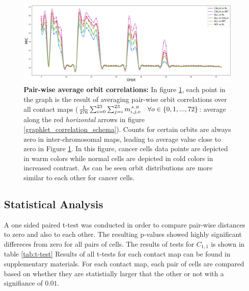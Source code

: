 \documentclass[a4,center,fleqn]{NAR}
\begin{document}
\begin{figure}
    \centering
    \includegraphics[width=\textwidth]{figures/orbits_correlations_all.png}
    \caption{
        \textbf{Pair-wise average orbit correlations:}
        In figure \ref{fig:orbits_correlations_all}, each point
        in the graph is the result of averaging pair-wise
        orbit correlations over all contact maps
        ($\frac{1}{276}\sum_{i=0}^{23}\sum_{j=i}^{23}{
        m^{\scriptscriptstyle \scriptscriptstyle A,B}_{i,j, o}} \quad 
        \forall o \in \{0, 1, ..., 72\}$:
        average along the red \textit{horizontal} arrows in figure 
        \ref{graphlet_correlation_schema}).
        Counts for certain orbits are always zero in inter-chromosomal
        maps, leading to average value close to zero in 
        Figure \ref{fig:orbits_correlations_all}.
        In this figure, cancer cells data points are depicted
        in warm colors while normal cells are depicted in
        cold colors in increased contrast. As can be seen
        orbit distributions are more similar to each other
        for cancer cells.
    }
    \label{fig:orbits_correlations_all}
\end{figure}


\subsection{Statistical Analysis}
A one sided paired t-test
was conducted in order to compare pair-wise distances to
zero and also to each other. 
The resulting p-values showed highly 
significant differeces from zero for all pairs of
cells. The results of tests for $C_{1,1}$ 
is shown in table \ref{tab:t-test}
Results of all t-tests for each
contact map can be found in supplementary materials.
For each contact map, each pair of cells are
compared based on whether they are statistially
larger that the other or not with a signifiance
of $0.01$.
\end{document}
